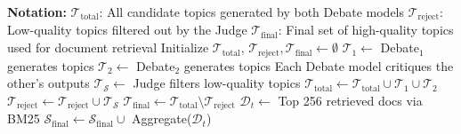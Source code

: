 \documentclass{article}
\theoremstyle{plain}
\theoremstyle{definition}
\theoremstyle{remark}
\begin{document}
    \begin{algorithm}[!tbp]
        \caption{Efficient Long-Context Data Synthesis via Multi-Agent Debate}
        \label{alg:multi-agent}
        \begin{algorithmic}[1]
        \State \textbf{Notation:}
        \State \hspace{1em} $\mathcal{T}_{\text{total}}$: All candidate topics generated by both Debate models
        \State \hspace{1em} $\mathcal{T}_{\text{reject}}$: Low-quality topics filtered out by the Judge
        \State \hspace{1em} $\mathcal{T}_{\text{final}}$: Final set of high-quality topics used for document retrieval
        \State Initialize $\mathcal{T}_{\text{total}}$, $\mathcal{T}_{\text{reject}}, \mathcal{T}_{\text{final}} \gets \emptyset$
            \State $\mathcal{T}_1 \gets$ Debate$_1$ generates topics
            \State $\mathcal{T}_2 \gets$ Debate$_2$ generates topics
            \State Each Debate model critiques the other's outputs
            \State $\mathcal{T}_{\mathcal{S}} \gets$ Judge filters low-quality topics
            \State $\mathcal{T}_{\text{total}} \gets \mathcal{T}_{\text{total}} \cup \mathcal{T}_1 \cup \mathcal{T}_2$
            \State $\mathcal{T}_{\text{reject}} \gets \mathcal{T}_{\text{reject}} \cup \mathcal{T}_{\mathcal{S}}$
        \EndFor
        \State $\mathcal{T}_{\text{final}} \gets \mathcal{T}_{\text{total}} \setminus \mathcal{T}_{\text{reject}}$
            \State $\mathcal{D}_t \gets$ Top 256 retrieved docs via BM25
            \State $\mathcal{S}_{\text{final}} \gets \mathcal{S}_{\text{final}} \cup$ Aggregate($\mathcal{D}_t$)
        \EndFor
        \end{algorithmic}
    \end{algorithm}
        
    
    
    
\end{document}
